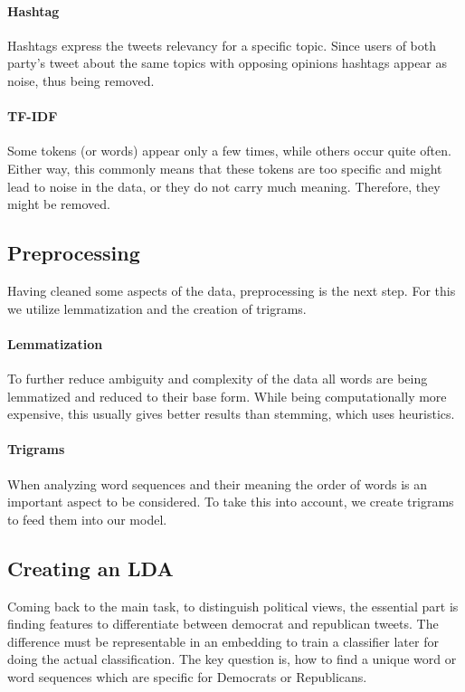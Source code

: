 \documentclass[sigconf, nonacm]{acmart}
\begin{document}
\paragraph{Hashtag} Hashtags express the tweets relevancy for a specific topic. Since users of both party's tweet about the same topics with opposing opinions hashtags appear as noise, thus being removed.

\paragraph{TF-IDF} Some tokens (or words) appear only a few times, while others occur quite often. Either way, this commonly means that these tokens are too specific and might lead to noise in the data, or they do not carry much meaning. Therefore, they might be removed.

\subsection{Preprocessing}
\label{subsec:process}
Having cleaned some aspects of the data, preprocessing is the next step. For this we utilize lemmatization and the creation of trigrams.

\paragraph{Lemmatization} To further reduce ambiguity and complexity of the data all words are being lemmatized and reduced to their base form.
While being computationally more expensive, this usually gives better results than stemming, which uses heuristics.

\paragraph{Trigrams} When analyzing word sequences and their meaning the order of words is an important aspect to be considered. To take this into account, we create trigrams to feed them into our model.

\subsection{Creating an LDA}
\label{subsec:lda}
Coming back to the main task, to distinguish political views, the essential part is finding features to differentiate between democrat and republican tweets. The difference must be representable in an embedding to train a classifier later for doing the actual classification. The key question is, how to find a unique word or word sequences which are specific for Democrats or Republicans.
\end{document}
